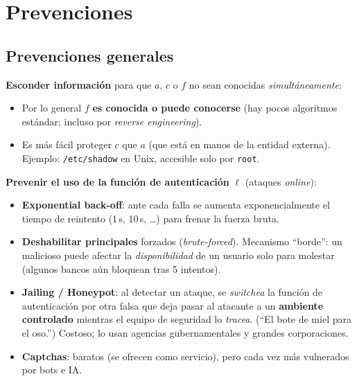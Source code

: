 \documentclass[11pt,a4paper]{article}
\begin{document}
\section{Prevenciones}

\subsection{Prevenciones generales}
\textbf{Esconder información} para que $a$, $c$ o $f$ no sean conocidas
\emph{simultáneamente}:
\begin{itemize}[leftmargin=1.4em,itemsep=1pt]
  \item Por lo general $f$ \textbf{es conocida o puede conocerse} (hay pocos algoritmos
        estándar; incluso por \emph{reverse engineering}).
  \item Es más fácil proteger $c$ que $a$ (que está en manos de la entidad externa).
        Ejemplo: \texttt{/etc/shadow} en Unix, accesible solo por \texttt{root}.
\end{itemize}
\textbf{Prevenir el uso de la función de autenticación} $\ell$ (ataques \emph{online}):
\begin{itemize}[leftmargin=1.4em,itemsep=1pt]
  \item \textbf{Exponential back-off}: ante cada falla se aumenta exponencialmente el tiempo
        de reintento (1\,s, 10\,s, \dots) para frenar la fuerza bruta.
  \item \textbf{Deshabilitar principales} forzados (\emph{brute-forced}). Mecanismo ``borde'':
        un malicioso puede afectar la \emph{disponibilidad} de un usuario solo para molestar
        (algunos bancos aún bloquean tras 5 intentos).
  \item \textbf{Jailing / Honeypot}: al detectar un ataque, se \emph{switchea} la función de
        autenticación por otra falsa que deja pasar al atacante a un \textbf{ambiente
        controlado} mientras el equipo de seguridad lo \emph{tracea}. (``El bote de miel para
        el oso.'') Costoso; lo usan agencias gubernamentales y grandes corporaciones.
  \item \textbf{Captchas}: baratos (se ofrecen como servicio), pero cada vez más vulnerados
        por bots e IA.
\end{itemize}
\end{document}
